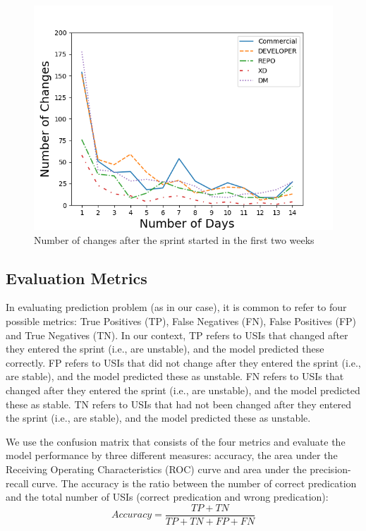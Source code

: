 \begin{figure}[ht]
\centering
\includegraphics[width=.45\textwidth]{Figures/number_changes_after_sprint_two_weeks_only_new.png}\quad

\caption[Number changes two weeks]{\centering Number of changes after the sprint started in the first two weeks}
\label{fig:changes after sprint}
\end{figure}



\subsection{Evaluation Metrics}

In evaluating prediction problem (as in our case), it is common to refer to four possible metrics: True Positives (TP), False Negatives (FN), False Positives (FP) and True Negatives (TN). In our context, TP refers to USIs that changed after they entered the sprint (i.e., are unstable), and the model predicted these correctly. FP refers to USIs that did not change after they entered the sprint (i.e., are stable), and the model predicted these as unstable. FN refers to USIs that changed after they entered the sprint (i.e., are unstable), and the model predicted these as stable. TN refers to USIs that had not been changed after they entered the sprint (i.e., are stable), and the model predicted these as unstable.

We use the confusion matrix that consists of the four metrics and evaluate the model performance by three different measures: accuracy, the area under the Receiving Operating Characteristics (ROC) curve and area under the precision-recall curve. 
The accuracy is the ratio between the number of correct predication and the total number of USIs (correct predication and wrong predication):
\begin{equation}
        Accuracy = \frac{TP + TN}{TP+TN+FP+FN}
\end{equation}

